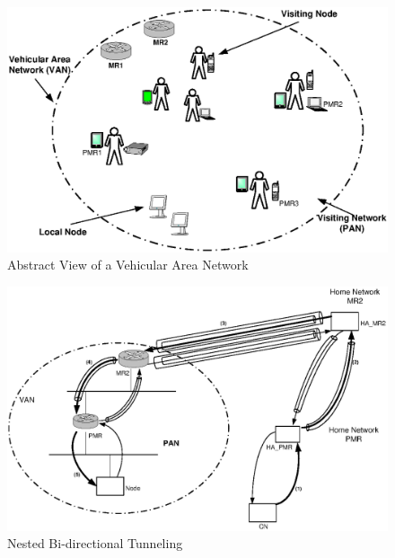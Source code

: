 \begin{figure}
    \centering
        \includegraphics{Chapter1/Fig002.eps}
    \caption{Abstract View of a Vehicular Area Network}
    \label{fig:Fig2}
\end{figure}

\begin{figure}
    \centering
        \includegraphics{Chapter1/Fig003.eps}
    \caption{Nested Bi-directional Tunneling}
    \label{fig:Fig3}
\end{figure}
